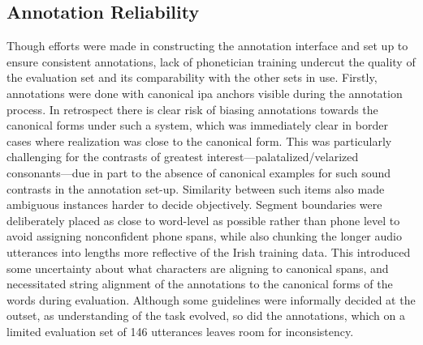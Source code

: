 \documentclass[thesis]{cluu}
\begin{document}
\subsection{Annotation Reliability}
Though efforts were made in constructing the annotation interface and set up to ensure consistent annotations, lack of phonetician training undercut the quality of the evaluation set and its comparability with the other sets in use. Firstly, annotations were done with canonical \gls{ipa} anchors visible during the annotation process. In retrospect there is clear risk of biasing annotations towards the canonical forms under such a system, which was immediately clear in border cases where realization was close to the canonical form. This was particularly challenging for the contrasts of greatest interest---palatalized/velarized consonants---due in part to the absence of canonical examples for such sound contrasts in the annotation set-up. Similarity between such items also made ambiguous instances harder to decide objectively. Segment boundaries were deliberately placed as close to word-level as possible rather than phone level to avoid assigning nonconfident phone spans, while also chunking the longer audio utterances into lengths more reflective of the Irish training data. This introduced some uncertainty about what characters are aligning to canonical spans, and necessitated string alignment of the annotations to the canonical forms of the words during evaluation. Although some guidelines were informally decided at the outset, as understanding of the task evolved, so did the annotations, which on a limited evaluation set of 146 utterances leaves room for inconsistency. 
\end{document}
